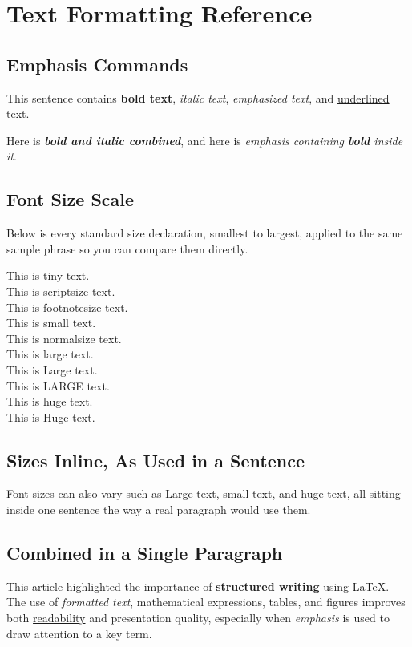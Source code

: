 \documentclass{article}
\begin{document}
\section{Text Formatting Reference}

\subsection{Emphasis Commands}

This sentence contains \textbf{bold text}, \textit{italic text},
\emph{emphasized text}, and \underline{underlined text}.

Here is \textbf{\textit{bold and italic combined}}, and here is
\emph{emphasis containing \textbf{bold} inside it}.

\subsection{Font Size Scale}

Below is every standard size declaration, smallest to largest,
applied to the same sample phrase so you can compare them directly.

{\tiny This is tiny text.}\\
{\scriptsize This is scriptsize text.}\\
{\footnotesize This is footnotesize text.}\\
{\small This is small text.}\\
{\normalsize This is normalsize text.}\\
{\large This is large text.}\\
{\Large This is Large text.}\\
{\LARGE This is LARGE text.}\\
{\huge This is huge text.}\\
{\Huge This is Huge text.}

\subsection{Sizes Inline, As Used in a Sentence}

Font sizes can also vary such as {\Large Large text}, {\small small
text}, and {\huge huge text}, all sitting inside one sentence the
way a real paragraph would use them.

\subsection{Combined in a Single Paragraph}

This article highlighted the importance of \textbf{structured
writing} using \LaTeX{}. The use of \textit{formatted text},
mathematical expressions, tables, and figures improves both
\underline{readability} and presentation quality, especially when
\emph{emphasis} is used to draw attention to a key term.
\end{document}
